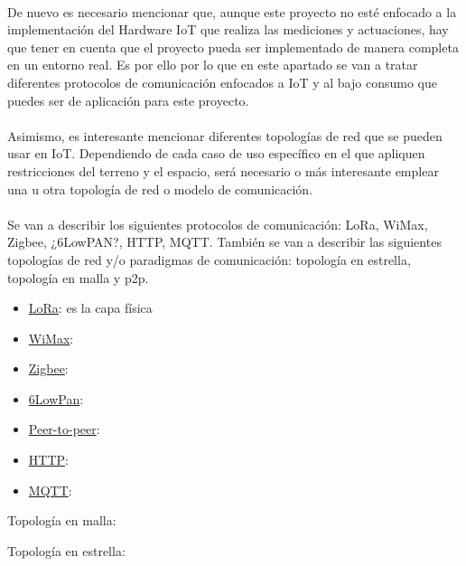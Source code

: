 \documentclass[../../memoria.tex]{subfiles}
\begin{document}
\paragraph{}
De nuevo es necesario mencionar que, aunque este proyecto no esté enfocado a la implementación del Hardware IoT que realiza las mediciones y actuaciones, hay que tener en cuenta que el proyecto pueda ser implementado de manera completa en un entorno real. Es por ello por lo que en este apartado se van a tratar diferentes protocolos de comunicación enfocados a IoT y al bajo consumo que puedes ser de aplicación para este proyecto.

\paragraph{}
Asimismo, es interesante mencionar diferentes topologías de red que se pueden usar en IoT. Dependiendo de cada caso de uso específico en el que apliquen restricciones del terreno y el espacio, será necesario o más interesante emplear una u otra topología de red o modelo de comunicación.

\paragraph{}
Se van a describir los siguientes protocolos de comunicación: LoRa, WiMax, Zigbee, ¿6LowPAN?, HTTP, MQTT. También se van a describir las siguientes topologías de red y/o paradigmas de comunicación: topología en estrella, topología en malla y p2p.


\begin{itemize}
    \item \uline{LoRa}: es la capa física \cite{lora} \cite{loratech}

    \item \uline{WiMax}:

    \item \uline{Zigbee}:

    \item \uline{6LowPan}:

    \item \uline{Peer-to-peer}:

    \item \uline{HTTP}:

    \item \uline{MQTT}:

\end{itemize}

Topología en malla:

Topología en estrella:
\end{document}
